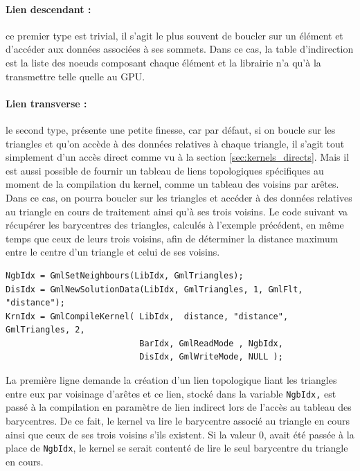 \documentclass[a4paper,12pt]{article}
\begin{document}
\paragraph{Lien descendant :} ce premier type est trivial, il s'agit le plus souvent de boucler sur un élément et d'accéder aux données associées à ses sommets.
Dans ce cas, la table d'indirection est la liste des noeuds composant chaque élément et la librairie n'a qu'à la transmettre telle quelle au GPU.

\paragraph{Lien transverse :} le second type, présente une petite finesse, car par défaut, si on boucle sur les triangles et qu'on accède à des données relatives à chaque triangle, il s'agit tout simplement d'un accès direct comme vu à la section \ref{sec:kernels_directs}.
Mais il est aussi possible de fournir un tableau de liens topologiques spécifiques au moment de la compilation du kernel, comme un tableau des voisins par arêtes.
Dans ce cas, on pourra boucler sur les triangles et accéder à des données relatives au triangle en cours de traitement ainsi qu'à ses trois voisins.
Le code suivant va récupérer les barycentres des triangles, calculés à l'exemple précédent, en même temps que ceux de leurs trois voisins, afin de déterminer la distance maximum entre le centre d'un triangle et celui de ses voisins.

\begin{tt}
\begin{verbatim}
NgbIdx = GmlSetNeighbours(LibIdx, GmlTriangles);
DisIdx = GmlNewSolutionData(LibIdx, GmlTriangles, 1, GmlFlt, "distance");
KrnIdx = GmlCompileKernel( LibIdx,  distance, "distance", GmlTriangles, 2,
                           BarIdx, GmlReadMode , NgbIdx,
                           DisIdx, GmlWriteMode, NULL );
\end{verbatim}
\end{tt}
\normalfont

La première ligne demande la création d'un lien topologique liant les triangles entre eux par voisinage d'arêtes et ce lien, stocké dans la variable {\tt NgbIdx,} est passé à la compilation en paramètre de lien indirect lors de l'accès au tableau des barycentres.
De ce fait, le kernel va lire le barycentre associé au triangle en cours ainsi que ceux de ses trois voisins s’ils existent.
Si la valeur $0$, avait été passée à la place de {\tt NgbIdx}, le kernel se serait contenté de lire le seul barycentre du triangle en cours.
\end{document}
